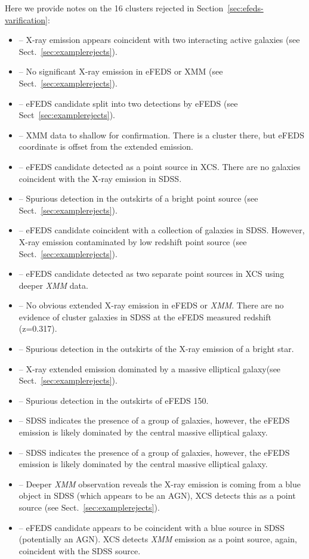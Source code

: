\documentclass[fleqn,usenatbib]{mnras}
\begin{document}
Here we provide notes on the 16 clusters rejected in Section~\ref{sec:efeds-varification}:
\begin{itemize}
\item[]  -- X-ray emission appears coincident with two interacting active galaxies (see Sect.~\ref{sec:examplerejects}).
\item[]  -- No significant X-ray emission in eFEDS or XMM (see Sect.~\ref{sec:examplerejects}).
\item[]  -- eFEDS candidate split into two detections by eFEDS (see Sect~\ref{sec:examplerejects}).
\item[]  -- XMM data to shallow for confirmation.  There is a cluster there, but eFEDS coordinate is offset from the extended emission. 
\item[]  -- eFEDS candidate detected as a point source in XCS.  There are no galaxies coincident with the X-ray emission in SDSS.
\item[]  -- Spurious detection in the outskirts of a bright point source (see Sect.~\ref{sec:examplerejects}).
\item[]  -- eFEDS candidate coincident with a collection of galaxies in SDSS.  However, X-ray emission contaminated by low redshift point source (see Sect.~\ref{sec:examplerejects}).
\item[]  -- eFEDS candidate detected as two separate point sources in XCS using deeper {\em XMM} data.
\item[]  -- No obvious extended X-ray emission in eFEDS or {\em XMM}.  There are no evidence of cluster galaxies in SDSS at the eFEDS measured redshift (z=0.317).
\item[]  -- Spurious detection in the outskirts of the X-ray emission of a bright star.
\item[]  -- X-ray extended emission dominated by a massive elliptical galaxy(see Sect.~\ref{sec:examplerejects}).
\item[]  -- Spurious detection in the outskirts of eFEDS 150.
\item[]  -- SDSS indicates the presence of a group of galaxies, however, the eFEDS emission is likely dominated by the central massive elliptical galaxy.
\item[]  -- SDSS indicates the presence of a group of galaxies, however, the eFEDS emission is likely dominated by the central massive elliptical galaxy.
\item[]  -- Deeper {\em XMM} observation reveals the X-ray emission is coming from a blue object in SDSS (which appears to be an AGN), XCS detects this as a point source (see Sect.~\ref{sec:examplerejects}).
\item[]  -- eFEDS candidate appears to be coincident with a blue source in SDSS (potentially an AGN).  XCS detects {\em XMM} emission as a point source, again, coincident with the SDSS source.
\end{itemize}
\end{document}
